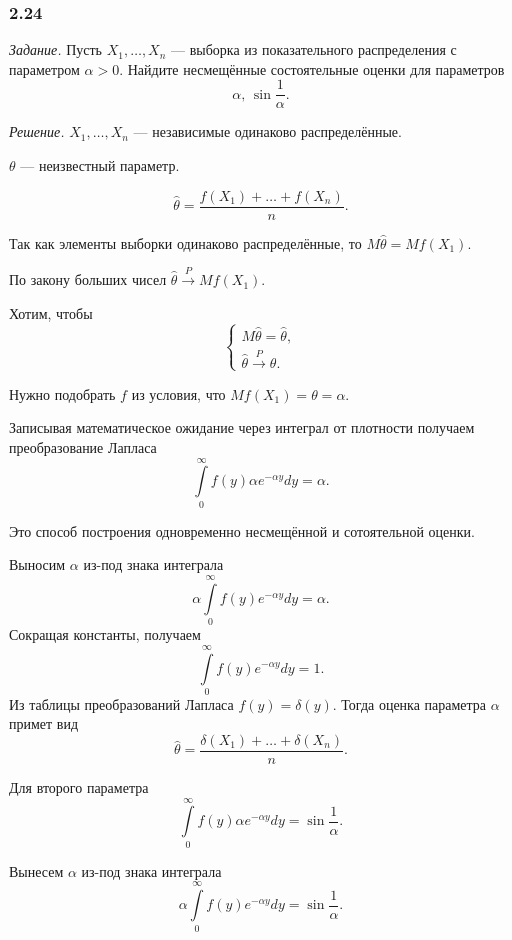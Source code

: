 \subsubsection*{2.24}

\textit{Задание.}
Пусть $X_1, \dotsc, X_n$ --- выборка из показательного распределения с параметром $ \alpha > 0$.
Найдите несмещённые состоятельные оценки для параметров
$$ \alpha, \,
  \sin \frac{1}{ \alpha }.$$

\textit{Решение.} $X_1, \dotsc, X_n$ --- независимые одинаково распределённые.

$ \theta $ --- неизвестный параметр.

$$ \hat{ \theta } =
  \frac{f \left( X_1 \right) + \dotsc + f \left( X_n \right) }{n}.$$

Так как элементы выборки одинаково распределённые, то $M \hat{ \theta } = Mf \left( X_1 \right) $.

По закону больших чисел $ \hat{ \theta } \overset{P}{ \to } Mf \left( X_1 \right) $.

Хотим, чтобы
$$ \begin{cases}
    M \hat{ \theta } = \hat{ \theta }, \\
    \hat{ \theta } \overset{P}{ \to } \theta.
  \end{cases}$$

Нужно подобрать $f$ из условия, что $Mf \left( X_1 \right) = \theta = \alpha $.

Записывая математическое ожидание через интеграл от плотности получаем преобразование Лапласа
$$ \int \limits_0^{ \infty } f \left( y \right) \alpha e^{- \alpha y} dy =
   \alpha.$$

Это способ построения одновременно несмещённой и сотоятельной оценки.

Выносим $ \alpha $ из-под знака интеграла
$$ \alpha \int \limits_0^{ \infty } f \left( y \right) e^{- \alpha y} dy =
  \alpha.$$
Сокращая константы, получаем
$$ \int \limits_0^{ \infty } f \left( y \right) e^{- \alpha y} dy =
  1.$$
Из таблицы преобразований Лапласа $f \left( y \right) = \delta \left( y \right) $.
Тогда оценка параметра $ \alpha $ примет вид
$$ \hat{ \theta } =
  \frac{ \delta \left( X_1 \right) + \dotsc + \delta \left( X_n \right) }{n}.$$

Для второго параметра
$$ \int \limits_0^{ \infty } f \left( y \right) \alpha e^{- \alpha y} dy =
  \sin \frac{1}{ \alpha }.$$

Вынесем $ \alpha $ из-под знака интеграла
$$ \alpha \int \limits_0^{ \infty } f \left( y \right) e^{- \alpha y} dy =
  \sin \frac{1}{ \alpha }.$$

